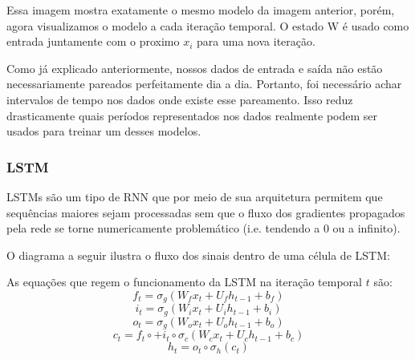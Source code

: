 % 


Essa imagem mostra exatamente o mesmo modelo da imagem anterior, porém, agora visualizamos o modelo a cada iteração temporal. O estado W é usado como entrada juntamente com o proximo $x_i$ para uma nova iteração.

\bigskip

Como já explicado anteriormente, nossos dados de entrada e saída não estão necessariamente pareados perfeitamente dia a dia. Portanto, foi necessário achar intervalos de tempo nos dados onde existe esse pareamento. Isso reduz drasticamente quais períodos representados nos dados realmente podem ser usados para treinar um desses modelos.


\subsubsection{LSTM}

LSTMs são um tipo de RNN que por meio de sua arquitetura permitem que sequências
maiores sejam processadas sem que o fluxo dos gradientes propagados pela rede se torne
numericamente problemático (i.e. tendendo a 0 ou a infinito).

O diagrama a seguir ilustra o fluxo dos sinais dentro de uma célula de LSTM: \\

\begin{center}

\end{center}

As equações que regem o funcionamento da LSTM na iteração temporal $t$ são: \\


\[f_t = \sigma_g(W_fx_t + U_fh_{t-1} + b_f)\]
\[i_t = \sigma_g(W_ix_t + U_ih_{t-1} + b_i)\]
\[o_t = \sigma_g(W_ox_t + U_oh_{t-1} + b_o)\]
\[c_t = f_t \circ + i_t \circ \sigma_c(W_cx_t + U_ch_{t-1} + b_c)\]
\[h_t = o_t \circ \sigma_h(c_t)\]




